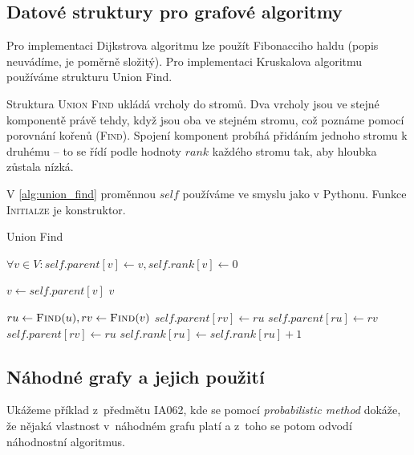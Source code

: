 \subsection{Datové struktury pro grafové algoritmy}
\label{subsec:data_structures}

Pro implementaci Dijkstrova algoritmu lze použít Fibonacciho haldu
(popis neuvádíme, je poměrně složitý). Pro implementaci Kruskalova
algoritmu používáme strukturu Union Find.

Struktura \textsc{Union Find} ukládá vrcholy do stromů.
Dva vrcholy jsou ve stejné komponentě právě tehdy, když jsou oba
ve stejném stromu, což poznáme pomocí porovnání kořenů (\textsc{Find}).
Spojení komponent probíhá přidáním jednoho stromu k druhému -- to se
řídí podle hodnoty $rank$ každého stromu tak, aby hloubka zůstala nízká.

V \autoref{alg:union_find} proměnnou $self$ používáme ve smyslu jako v
Pythonu. Funkce \textsc{Initialze} je konstruktor.

\begin{algorithm}[H]
\caption{Union Find}
\label{alg:union_find}
\begin{algorithmic}[1]
    \State $\forall v \in V : self.parent[v] \gets v, self.rank[v] \gets 0$
\EndFunction

        \State $v \gets self.parent[v]$
    \EndWhile
    \State \Return $v$
\EndFunction

    \State $ru \gets \Call{Find}{u}, rv \gets \Call{Find}{v}$
            \State $self.parent[rv] \gets ru$
            \State $self.parent[ru] \gets rv$
        \Else
            \State $self.parent[rv] \gets ru$
            \State $self.rank[ru] \gets self.rank[ru] + 1$
        \EndIf
    \EndIf
\EndFunction

\end{algorithmic}
\end{algorithm}


\subsection{Náhodné grafy a jejich použití}

Ukážeme příklad z~předmětu IA062, kde se pomocí {\em probabilistic
method} dokáže, že nějaká vlastnost v~náhodném grafu platí a z~toho se
potom odvodí náhodnostní algoritmus.

